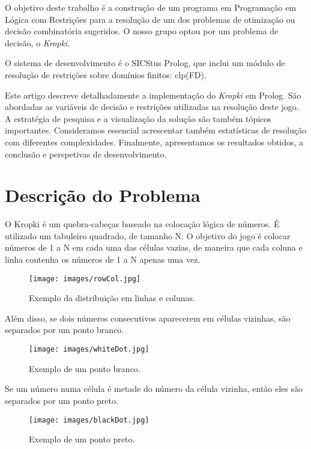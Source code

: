 \documentclass[runningheads,a4paper]{llncs}
\begin{document}
O objetivo deste trabalho é a construção de um programa em Programação em Lógica com Restrições para a resolução de um dos problemas de otimização ou decisão combinatória sugeridos. O nosso grupo optou por um problema de decisão, o \textit{Kropki}.
 
O sistema de desenvolvimento é o SICStus Prolog, que inclui um módulo de resolução de restrições sobre domínios finitos: clp(FD).

Este artigo descreve detalhadamente a implementação do \textit{Kropki} em Prolog. São abordadas as variáveis de decisão e restrições utilizadas na resolução deste jogo. A estratégia de pesquisa e a visualização da solução são também tópicos importantes. Consideramos essencial acrescentar também estatísticas de resolução com diferentes complexidades. Finalmente, apresentamos os resultados obtidos, a conclusão e perspetivas de desenvolvimento.

\section{Descrição do Problema}

O Kropki é um quebra-cabeças baseado na colocação lógica de números. É utilizado um tabuleiro quadrado, de tamanho N. O objetivo do jogo é colocar números de 1 a N em cada uma das células vazias, de maneira que cada coluna e linha contenha os números de 1 a N apenas uma vez.

\begin{figure}[H]
	\centering
	\texttt{[image: images/rowCol.jpg]}
	\caption{Exemplo da distribuição em linhas e colunas.}
	\label{fig:rowCol}
\end{figure}  
	
Além disso, se dois números consecutivos aparecerem em células vizinhas, são separados por um ponto branco. 

\begin{figure}[H]
	\centering
	\texttt{[image: images/whiteDot.jpg]}
	\caption{Exemplo de um ponto branco.}
	\label{fig:whiteDot}
\end{figure}      

Se um número numa célula é metade do número da célula vizinha, então eles são separados por um ponto preto.

\begin{figure}[H]
	\centering
	\texttt{[image: images/blackDot.jpg]}
	\caption{Exemplo de um ponto preto.}
	\label{fig:blackDot}
\end{figure}
\end{document}
